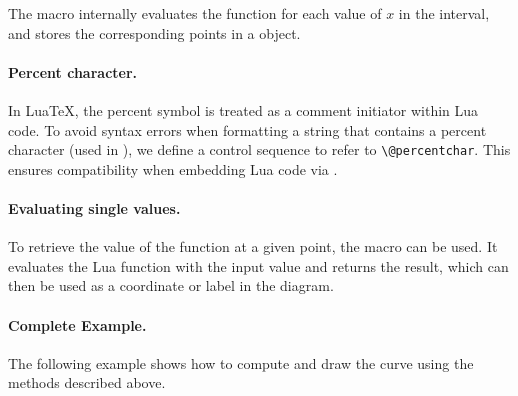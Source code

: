 The macro internally evaluates the function for each value of $x$ in the interval, and stores the corresponding points in a  object.

\paragraph{Percent character.}
In LuaTeX, the percent symbol \code{\%} is treated as a comment initiator within Lua code. To avoid syntax errors when formatting a string that contains a percent character (used in ), we define a control sequence  to refer to \verb|\@percentchar|. This ensures compatibility when embedding Lua code via .

\paragraph{Evaluating single values.}
To retrieve the value of the function at a given point, the macro  can be used. It evaluates the Lua function with the input value and returns the result, which can then be used as a coordinate or label in the diagram.

\paragraph{Complete Example.}
The following example shows how to compute and draw the curve using the methods described above.

\def\tkzfct{x*exp(-x^2)+1}

\def\tkzval#1{%
  \directlua{%
    local expr = [[\tkzfct]]
    local f = load(("return function (x)
                      return (\percentchar s)
                    end"):format(expr), nil, 't', math)()
    tex.print(f(#1))
  }
}

\def\tkzGetPath(#1,#2,#3,#4,#5){%
  \directlua{
    local min, max, nb = #2, #3, #4
    local expr = [[#1]]
    PA.#5 = path()
    local f = load(("return function (x)
                      return (\percentchar s)
                    end"):format(expr), nil, 't', math)()
    for t = min, max, (max - min) / nb do
      local y = f(t)
      local pt = point(t, y)
      if y == math.huge or y == -math.huge then
        tex.print("problem")
      end
      PA.#5:add_point(pt)
    end
  }
}
\begin{center}
\end{center}

